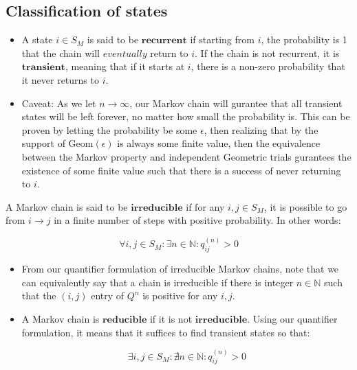 \subsection{Classification of states}

\begin{itemize}
\item A state $i \in S_M$ is said to be $\textbf{recurrent}$ if starting from $i$, the probability is 1 that the chain will $\textit{eventually}$ return to $i$. If the chain is not recurrent, it is $\textbf{transient}$, meaning that if it starts at $i$, there is a non-zero probability that it never returns to $i$.

\item Caveat: As we let $n \to \infty$, our Markov chain will gurantee that all transient states will be left forever, no matter how small the probability is. This can be proven by letting the probability be some $\epsilon$, then realizing that by the support of $\text{Geom}(\epsilon)$ is always some finite value, then the equivalence between the Markov property and independent Geometric trials gurantees the existence of some finite value such that there is a success of never returning to $i$.
\end{itemize}

\begin{definition}[Reducibility] A Markov chain is said to be $\textbf{irreducible}$ if for any $i,j \in S_M$, it is possible to go from $i \to j$ in a finite number of steps with positive probability. In other words:
\end{definition}

$$\forall i,j \in S_M: \exists n \in \mathbb{N} : q_{ij}^{(n)} > 0$$
\begin{itemize}
\item From our quantifier formulation of irreducible Markov chains, note that we can equivalently say that a chain is irreducible if there is integer $n \in \mathbb{N}$ such that the $(i,j)$ entry of $Q^n$ is positive for any $i,j$.

\item A Markov chain is $\textbf{reducible}$ if it is not $\textbf{irreducible}$. Using our quantifier formulation, it means that it suffices to find transient states so that:

$$\exists i,j \in S_M: \nexists n \in \mathbb{N} : q_{ij}^{(n)} > 0$$
\end{itemize}



